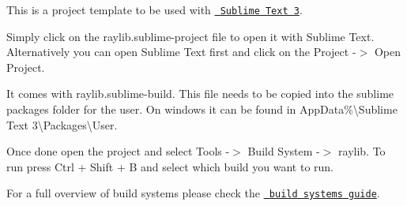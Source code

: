 This is a project template to be used with \href{https://www.sublimetext.com/}{\texttt{ Sublime Text 3}}.

Simply click on the {\ttfamily raylib.\+sublime-\/project} file to open it with Sublime Text. Alternatively you can open Sublime Text first and click on the {\ttfamily Project -\/$>$ Open Project}.

It comes with raylib.\+sublime-\/build. This file needs to be copied into the sublime packages folder for the user. On windows it can be found in {\ttfamily App\+Data\%\textbackslash{}Sublime Text 3\textbackslash{}Packages\textbackslash{}User}.

Once done open the project and select {\ttfamily Tools -\/$>$ Build System -\/$>$ raylib}. To run press Ctrl + Shift + B and select which build you want to run.

For a full overview of build systems please check the \href{https://www.sublimetext.com/docs/3/build_systems.html}{\texttt{ build systems guide}}. 
